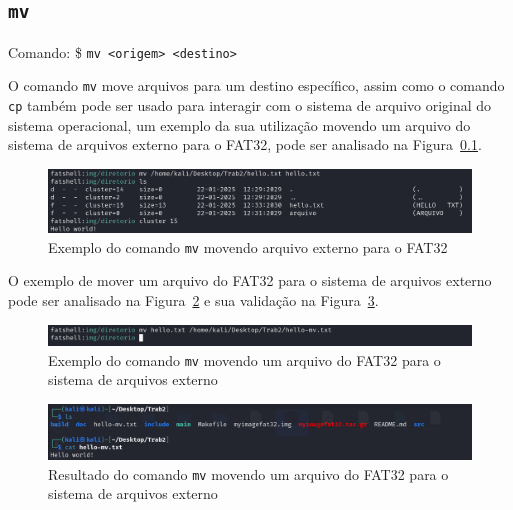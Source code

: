 \documentclass[
    12pt,				%
    oneside,   	        %
    a4paper,			%
    english,			%
    french,				%
    spanish,			%
    brazil,				%
    ]{pacotes/abntex2}
\begin{document}

\subsection{\texttt{mv}}
\label{subsec:mv}
Comando: \$ \texttt{mv <origem> <destino>}

O comando \texttt{mv} move arquivos para um destino específico, assim como o comando \texttt{cp} também pode ser usado para interagir com o sistema de arquivo original do sistema operacional, um exemplo da sua utilização movendo um arquivo do sistema de arquivos externo para o FAT32, pode ser analisado na Figura~\ref{subsec:mv}.

\begin{figure}[H]
    \centering
    \includegraphics[width=450pt]{figuras/resultados/12-mv-externo-iterno.PNG}
    \caption{Exemplo do comando \texttt{mv} movendo arquivo externo para o FAT32}
    \label{fig:mv-externo-interno}
\end{figure}

O exemplo de mover um arquivo do FAT32 para o sistema de arquivos externo pode ser analisado na Figura~\ref{fig:mv-interno-externo} e sua validação na Figura~\ref{fig:mv-externo-validacao}.

\begin{figure}[H]
    \centering
    \includegraphics[width=450pt]{figuras/resultados/13-mv-interno-externo.PNG}
    \caption{Exemplo do comando \texttt{mv} movendo um arquivo do FAT32 para o sistema de arquivos externo}
    \label{fig:mv-interno-externo}
\end{figure}

\begin{figure}[H]
    \centering
    \includegraphics[width=450pt]{figuras/resultados/14-mv-externo-validacao.PNG}
    \caption{Resultado do comando \texttt{mv} movendo um arquivo do FAT32 para o sistema de arquivos externo}
    \label{fig:mv-externo-validacao}
\end{figure}
\end{document}

